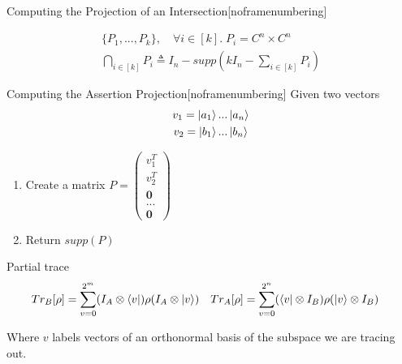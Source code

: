 \documentclass[11pt,svgnames,smaller,aspectratio=43,english]{beamer}
\newcommand{\tensor}{\otimes}
\begin{document}
\begin{frame}{Computing the Projection of an Intersection}[noframenumbering]

	\begin{gather*}
		\{P_1, ..., P_k\},\quad \forall i\in [k].\; P_i = C^n \times C^n\\
		\bigcap_{i\in [k]} P_i \triangleq I_n - supp(kI_n - \sum_{i\in [k]} P_i)
	\end{gather*}
\end{frame}

\begin{frame}{Computing the Assertion Projection}[noframenumbering]
	Given two vectors
	\begin{gather*}
		v_1 = \ket{a_1}...\ket{a_n}\\
		v_2 = \ket{b_1}...\ket{b_n}
	\end{gather*}
	\begin{enumerate}
		\item Create a matrix $P = \begin{pmatrix}
			v_1^T \\ v_2^T \\ \mathbf{0} \\ ... \\ \mathbf{0}
		\end{pmatrix}$
		\item Return $supp(P)$
	\end{enumerate}
\end{frame}

\begin{frame}{Partial trace}
	\begin{align*}
		Tr_B[\rho] &= \sum_{v=0}^{2^m} (I_A \tensor \bra{v})\rho(I_A \tensor \ket{v}) && Tr_A[\rho] = \sum_{v=0}^{2^n} (\bra{v} \tensor I_B)\rho(\ket{v} \tensor I_B)
	\end{align*}
	\begin{center}
		Where $v$ labels vectors of an orthonormal basis of the subspace we are tracing out.		
	\end{center}
\end{frame}
\end{document}
